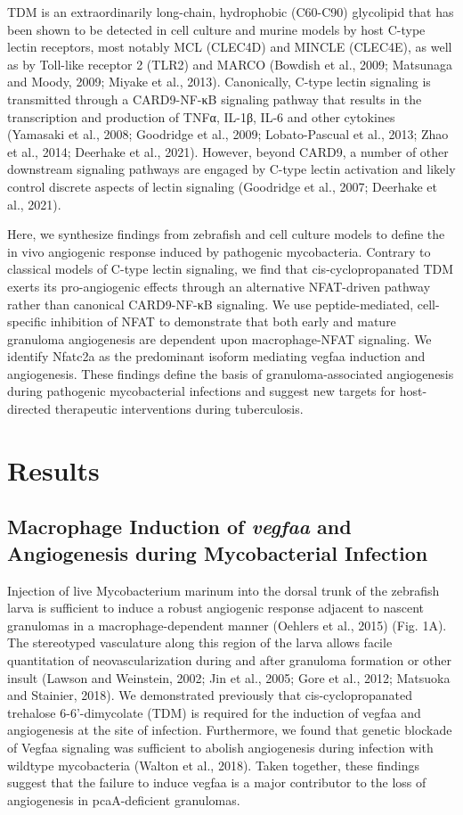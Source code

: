 TDM is an extraordinarily long-chain, hydrophobic (C60-C90) glycolipid that has been shown to be detected in cell culture and murine models by host C-type lectin receptors, most notably MCL (CLEC4D) and MINCLE (CLEC4E), as well as by Toll-like receptor 2 (TLR2) and MARCO (Bowdish et al., 2009; Matsunaga and Moody, 2009; Miyake et al., 2013). Canonically, C-type lectin signaling is transmitted through a CARD9-NF-κB signaling pathway that results in the transcription and production of TNFα, IL-1β, IL-6 and other cytokines (Yamasaki et al., 2008; Goodridge et al., 2009; Lobato-Pascual et al., 2013; Zhao et al., 2014; Deerhake et al., 2021). However, beyond CARD9, a number of other downstream signaling pathways are engaged by C-type lectin activation and likely control discrete aspects of lectin signaling (Goodridge et al., 2007; Deerhake et al., 2021).

Here, we synthesize findings from zebrafish and cell culture models to define the in vivo angiogenic response induced by pathogenic mycobacteria. Contrary to classical models of C-type lectin signaling, we find that cis-cyclopropanated TDM exerts its pro-angiogenic effects through an alternative NFAT-driven pathway rather than canonical CARD9-NF-κB signaling. We use peptide-mediated, cell-specific inhibition of NFAT to demonstrate that both early and mature granuloma angiogenesis are dependent upon macrophage-NFAT signaling. We identify Nfatc2a as the predominant isoform mediating vegfaa induction and angiogenesis. These findings define the basis of granuloma-associated angiogenesis during pathogenic mycobacterial infections and suggest new targets for host-directed therapeutic interventions during tuberculosis.

\section{Results}

\subsection{Macrophage Induction of \textit{vegfaa} and Angiogenesis during Mycobacterial Infection}

Injection of live Mycobacterium marinum into the dorsal trunk of the zebrafish larva is sufficient to induce a robust angiogenic response adjacent to nascent granulomas in a macrophage-dependent manner (Oehlers et al., 2015) (Fig. 1A). The stereotyped vasculature along this region of the larva allows facile quantitation of neovascularization during and after granuloma formation or other insult (Lawson and Weinstein, 2002; Jin et al., 2005; Gore et al., 2012; Matsuoka and Stainier, 2018). We demonstrated previously that cis-cyclopropanated trehalose 6-6’-dimycolate (TDM) is required for the induction of vegfaa and angiogenesis at the site of infection. Furthermore, we found that genetic blockade of Vegfaa signaling was sufficient to abolish angiogenesis during infection with wildtype mycobacteria (Walton et al., 2018). Taken together, these findings suggest that the failure to induce vegfaa is a major contributor to the loss of angiogenesis in pcaA-deficient granulomas.

